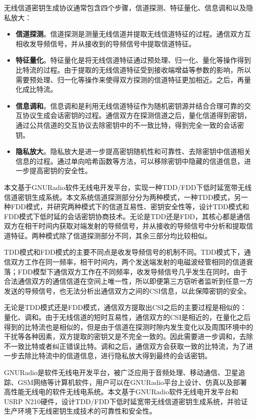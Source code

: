 \documentclass[master]{seuthesis} %
\begin{document}
\begin{Main}
无线信道密钥生成协议通常包含四个步骤，信道探测、特征量化、信息调和以及隐私放大：

\begin{itemize}
    \item \textbf{信道探测}。信道探测是测量无线信道并提取无线信道特征的过程。通信双方互相收发导频信号，并从接收到的导频信号中提取信道特征。
    \item \textbf{特征量化}。特征量化是将无线信道特征通过预处理、归一化、量化等操作得到比特流的过程。由于提取的无线信道特征受到接收端增益等参数的影响，所以需要预处理、归一化等操作来使得双方探测的信道特征更加相近。之后，再量化成比特流。
    \item \textbf{信息调和}。信息调和是利用无线信道特征作为随机密钥源并结合合理可靠的交互协议生成会话密钥的过程。通信双方在探测信道之后，量化信道得到密钥，通过公共信道的交互协议去除密钥中的不一致比特，得到完全一致的会话密钥\cite{cachin1997linking}。
    \item \textbf{隐私放大}。隐私放大是进一步提高密钥随机性和可靠性、去除密钥中信道相关信息的过程。通过单向哈希函数等方法，可以移除密钥中隐藏的信道信息，进一步提高密钥的安全性\cite{cachin1997linking}。
\end{itemize}

本文基于GNURadio软件无线电开发平台，实现一种TDD/FDD下低时延宽带无线信道密钥生成系统。本文系统信道探测部分分为两种模式，一种TDD模式，另一种FDD模式，并研究两种模式下的信道互易性、密钥安全性等，设计TDD模式和FDD模式下低时延的会话密钥协商技术。无论是TDD还是FDD，其核心都是通信双方在相干时间内获取对端发射的导频信号，并从接收的导频信号中分析和提取信道特征。两种模式除了信道探测部分不同，其余三部分均比较相似。

TDD模式和FDD模式的主要不同点是收发导频信号的机制不同。TDD模式下，通信双方工作在同一频率，相干时间内，两个发送端发射的电磁波经管相同的信道衰落；FDD模型下通信双方工作在不同频率，收发导频信号几乎发生在同时。由于合法通信双方的通信信道在空间上唯一性，所以即便第三方窃听者监听到任意一方发送的导频信号，也无法分析出通信双方之间的CSI信息，以此保障密钥的安全。

无论是TDD模式还是FDD模式，通信双方提取出CSI之后的主要过程是相似的：量化、调和。由于无线信道的短时互易性，通信双方的CSI是相近的，在量化之后得到的比特流也是相似的，但是由于信道在探测时隙内发生变化以及周围环境中的干扰等各种因素，双方提取的密钥又是不完全一致的。因此需要进一步调和，去除不一致比特或者纠正错误比特。调和之后，通信双方会获取一致的比特流，为了进一步去除比特流中的信道信息，进行隐私放大得到最终的会话密钥。

GNURadio是软件无线电开发平台，被广泛应用于音频处理、移动通信、卫星追踪、GSM网络等计算机软件\cite{Blossom2004GNU}，用户可以在GNURadio平台上设计、仿真以及部署高性能无线电的软件无线电系统。本文基于GNURadio软件无线电开发平台和USRP N210硬件，设计TDD/FDD下低时延宽带无线信道密钥生成系统，并验证生产环境下无线密钥生成技术的可靠性和安全性。


\end{Main}
\end{document}
